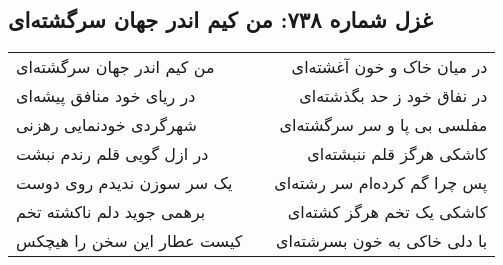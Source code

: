 \begin{center}
\section*{غزل شماره ۷۳۸: من کیم اندر جهان سرگشته‌ای}
\label{sec:738}
\begin{longtable}{l p{0.5cm} r}
من کیم اندر جهان سرگشته‌ای
&&
در میان خاک و خون آغشته‌ای
\\
در ریای خود منافق پیشه‌ای
&&
در نفاق خود ز حد بگذشته‌ای
\\
شهرگردی خودنمایی رهزنی
&&
مفلسی بی پا و سر سرگشته‌ای
\\
در ازل گویی قلم رندم نبشت
&&
کاشکی هرگز قلم ننبشته‌ای
\\
یک سر سوزن ندیدم روی دوست
&&
پس چرا گم کرده‌ام سر رشته‌ای
\\
برهمی جوید دلم ناکشته تخم
&&
کاشکی یک تخم هرگز کشته‌ای
\\
کیست عطار این سخن را هیچکس
&&
با دلی خاکی به خون بسرشته‌ای
\\
\end{longtable}
\end{center}
